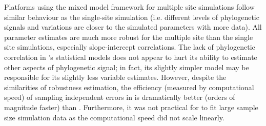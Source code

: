 Platforms using the mixed model framework for multiple site simulations follow similar behaviour as the single-site simulation (i.e. different levels of phylogenetic signals and variations are closer to the simulated parameters with more data). 
All parameter estimates are much more robust for the multiple site than the single site simulations, especially slope-intercept correlations.
The lack of phylogenetic correlation in 's statistical models does not appear to hurt its ability to estimate other aspects of phylogenetic signal; in fact, its slightly simpler model may be responsible for its slightly less variable estimates.
However, despite the similarities of robustness estimation, the efficiency (measured by computational speed) of sampling independent errors in  is dramatically better (orders of magnitude faster) than .
Furthermore, it was not practical for  to fit large sample size simulation data as the computational speed did not scale linearly.

